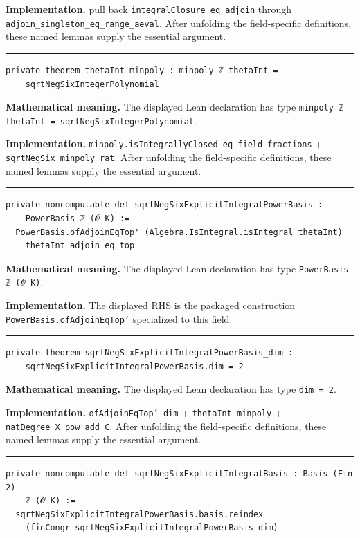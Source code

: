 \documentclass[UTF8,a4paper,11pt,fontset=fandol]{ctexart}
\theoremstyle{definition}
\newcommand{\statementsep}{\par\medskip\hrule\medskip}
\begin{document}
\noindent\textbf{Implementation.} pull back \texttt{integralClosure\_\allowbreak{}eq\_\allowbreak{}adjoin} through \texttt{adjoin\_\allowbreak{}singleton\_\allowbreak{}eq\_\allowbreak{}range\_\allowbreak{}aeval}. After unfolding the field-specific definitions, these named lemmas supply the essential argument.\par
\statementsep
\begin{verbatim}
private theorem thetaInt_minpoly : minpoly ℤ thetaInt =
    sqrtNegSixIntegerPolynomial
\end{verbatim}
\noindent\textbf{Mathematical meaning.} The displayed Lean declaration has type \texttt{minpoly ℤ thetaInt = sqrtNegSixIntegerPolynomial}.\par
\noindent\textbf{Implementation.} \texttt{minpoly.\allowbreak{}isIntegrallyClosed\_\allowbreak{}eq\_\allowbreak{}field\_\allowbreak{}fractions} + \texttt{sqrtNegSix\_\allowbreak{}minpoly\_\allowbreak{}rat}. After unfolding the field-specific definitions, these named lemmas supply the essential argument.\par
\statementsep
\begin{verbatim}
private noncomputable def sqrtNegSixExplicitIntegralPowerBasis :
    PowerBasis ℤ (𝓞 K) :=
  PowerBasis.ofAdjoinEqTop' (Algebra.IsIntegral.isIntegral thetaInt)
    thetaInt_adjoin_eq_top
\end{verbatim}
\noindent\textbf{Mathematical meaning.} The displayed Lean declaration has type \texttt{PowerBasis ℤ (𝓞 K)}.\par
\noindent\textbf{Implementation.} The displayed RHS is the packaged construction \texttt{PowerBasis.\allowbreak{}ofAdjoinEqTop'} specialized to this field.\par
\statementsep
\begin{verbatim}
private theorem sqrtNegSixExplicitIntegralPowerBasis_dim :
    sqrtNegSixExplicitIntegralPowerBasis.dim = 2
\end{verbatim}
\noindent\textbf{Mathematical meaning.} The displayed Lean declaration has type \texttt{dim = 2}.\par
\noindent\textbf{Implementation.} \texttt{ofAdjoinEqTop'\_\allowbreak{}dim} + \texttt{thetaInt\_\allowbreak{}minpoly} + \texttt{natDegree\_\allowbreak{}X\_\allowbreak{}pow\_\allowbreak{}add\_\allowbreak{}C}. After unfolding the field-specific definitions, these named lemmas supply the essential argument.\par
\statementsep
\begin{verbatim}
private noncomputable def sqrtNegSixExplicitIntegralBasis : Basis (Fin 2)
    ℤ (𝓞 K) :=
  sqrtNegSixExplicitIntegralPowerBasis.basis.reindex
    (finCongr sqrtNegSixExplicitIntegralPowerBasis_dim)
\end{verbatim}
\end{document}
